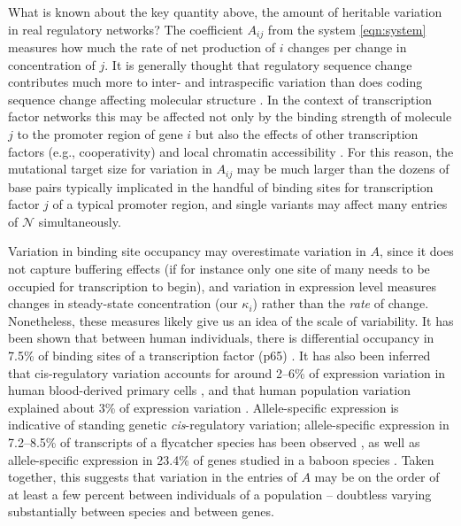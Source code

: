 \documentclass{article}
\newcommand{\1}{\mathbbm{1}}
\newcommand{\allS}{\mathcal{N}}
\begin{document}
What is known about the key quantity above, the amount of heritable variation in real regulatory networks?
The coefficient $A_{ij}$ from the system \eqref{eqn:system} measures how much the rate of net production of $i$ changes
per change in concentration of $j$.
It is generally thought that regulatory sequence change contributes much more to inter- and intraspecific variation
than does coding sequence change affecting molecular structure \citep{schmidt2010fivevertebrate}.
In the context of transcription factor networks this may be affected 
not only by the binding strength of molecule $j$ to the promoter region of gene $i$
but also the effects of other transcription factors (e.g., cooperativity)
and local chromatin accessibility \citep{stefflova2013cooperativity}.
For this reason, 
the mutational target size for variation in $A_{ij}$ may be much larger than the dozens of base pairs
typically implicated in the handful of binding sites for transcription factor $j$ of a typical promoter region,
and single variants may affect many entries of $\allS$ simultaneously.

Variation in binding site occupancy may overestimate variation in $A$,
since it does not capture buffering effects (if for instance only one site of many needs to be occupied for transcription to begin),
and variation in expression level measures changes in steady-state concentration (our $\kappa_i$) rather than the \emph{rate} of change.
Nonetheless, these measures likely give us an idea of the scale of variability.
It has been shown that between human individuals, there is differential occupancy in 7.5\%
of binding sites of a transcription factor (p65) \cite{kasowski2010variation}.
It has also been inferred that cis-regulatory variation
accounts for around 2--6\% of expression variation in human blood-derived primary cells \cite{verlaan2009targeted}, and
that human population variation 
explained about 3\% of expression variation \cite{lappalainen2013transcriptome}.
Allele-specific expression is indicative of standing genetic \emph{cis}-regulatory variation;
allele-specific expression in 7.2--8.5\% of transcripts of a flycatcher species has been observed \cite{wang2017bayesian}, as well as
allele-specific expression in 23.4\% of genes studied in a baboon species \cite{tung2015genetic}. 
Taken together, this suggests that variation in the entries of $A$
may be on the order of at least a few percent between individuals of a population --
doubtless varying substantially between species and between genes.
\end{document}
